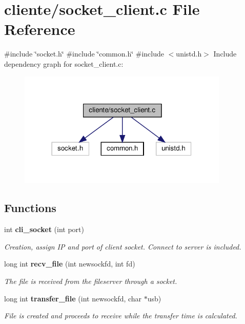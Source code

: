 \section{cliente/socket\+\_\+client.c File Reference}
\label{socket__client_8c}
{\ttfamily \#include \char`\"{}socket.\+h\char`\"{}}\newline
{\ttfamily \#include \char`\"{}common.\+h\char`\"{}}\newline
{\ttfamily \#include $<$unistd.\+h$>$}\newline
Include dependency graph for socket\+\_\+client.\+c\+:\nopagebreak
\begin{figure}[H]
\begin{center}
\leavevmode
\includegraphics[width=284pt]{socket__client_8c__incl}
\end{center}
\end{figure}
\subsection*{Functions}
\begin{DoxyCompactItemize}
\item 
int \textbf{ cli\+\_\+socket} (int port)
\begin{DoxyCompactList}\small\item\em Creation, assign IP and port of client socket. Connect to server is included. \end{DoxyCompactList}\item 
long int \textbf{ recv\+\_\+file} (int newsockfd, int fd)
\begin{DoxyCompactList}\small\item\em The file is received from the fileserver through a socket. \end{DoxyCompactList}\item 
long int \textbf{ transfer\+\_\+file} (int newsockfd, char $\ast$usb)
\begin{DoxyCompactList}\small\item\em File is created and proceeds to receive while the transfer time is calculated. \end{DoxyCompactList}\end{DoxyCompactItemize}



